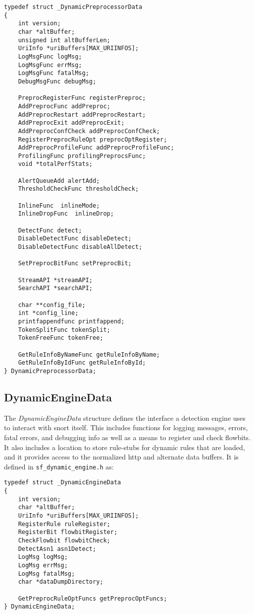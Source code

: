 \documentclass[english]{report}
\begin{document}
\begin{verbatim}
typedef struct _DynamicPreprocessorData
{
    int version;
    char *altBuffer;
    unsigned int altBufferLen;
    UriInfo *uriBuffers[MAX_URIINFOS];
    LogMsgFunc logMsg;
    LogMsgFunc errMsg;
    LogMsgFunc fatalMsg;
    DebugMsgFunc debugMsg;

    PreprocRegisterFunc registerPreproc;
    AddPreprocFunc addPreproc;
    AddPreprocRestart addPreprocRestart;
    AddPreprocExit addPreprocExit;
    AddPreprocConfCheck addPreprocConfCheck;
    RegisterPreprocRuleOpt preprocOptRegister;
    AddPreprocProfileFunc addPreprocProfileFunc;
    ProfilingFunc profilingPreprocsFunc;
    void *totalPerfStats;

    AlertQueueAdd alertAdd;
    ThresholdCheckFunc thresholdCheck;

    InlineFunc  inlineMode;
    InlineDropFunc  inlineDrop;

    DetectFunc detect;
    DisableDetectFunc disableDetect;
    DisableDetectFunc disableAllDetect;

    SetPreprocBitFunc setPreprocBit;

    StreamAPI *streamAPI;
    SearchAPI *searchAPI;

    char **config_file;
    int *config_line;
    printfappendfunc printfappend;
    TokenSplitFunc tokenSplit;
    TokenFreeFunc tokenFree;

    GetRuleInfoByNameFunc getRuleInfoByName;
    GetRuleInfoByIdFunc getRuleInfoById;
} DynamicPreprocessorData;
\end{verbatim}

\subsection{DynamicEngineData}
The {\em DynamicEngineData} structure defines the interface a detection
engine uses to interact with snort itself.  This includes functions for
logging messages, errors, fatal errors, and debugging info as well as
a means to register and check flowbits.  It also includes a location
to store rule-stubs for dynamic rules that are loaded, and
it provides access to the normalized http and alternate data buffers.
It is defined in \texttt{sf\_dynamic\_engine.h} as:

\begin{verbatim}
typedef struct _DynamicEngineData
{
    int version;
    char *altBuffer;
    UriInfo *uriBuffers[MAX_URIINFOS];
    RegisterRule ruleRegister;
    RegisterBit flowbitRegister;
    CheckFlowbit flowbitCheck;
    DetectAsn1 asn1Detect;
    LogMsg logMsg;
    LogMsg errMsg;
    LogMsg fatalMsg;
    char *dataDumpDirectory;

    GetPreprocRuleOptFuncs getPreprocOptFuncs;
} DynamicEngineData;
\end{verbatim}
\end{document}
